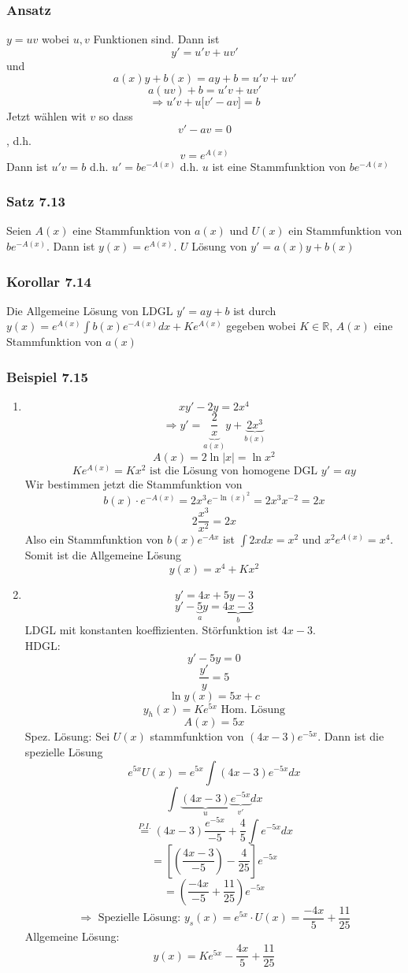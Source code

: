 \subsubsection*{Ansatz}
$y=uv$ wobei $u,v$ Funktionen sind. Dann ist $$y'=u'v+uv'$$ und $$a(x)y+b(x)=ay+b=u'v+uv'$$$$a(uv)+b=u'v+uv'$$$$\Rightarrow u'v+u\lbrack v'-av\rbrack =b$$
Jetzt wählen wit $v$ so dass $$v'-av=0$$, d.h. $$v=e^{A(x)}$$ Dann ist $u'v=b$ d.h. $u'=be^{-A(x)}$ d.h. $u$ ist eine Stammfunktion von $be^{-A(x)}$

\subsubsection*{Satz 7.13}
Seien $A(x)$ eine Stammfunktion von $a(x)$ und $U(x)$ ein Stammfunktion von $be^{-A(x)}$. Dann ist $y(x)=e^{A(x)}$. $U$ Lösung von $y'=a(x)y+b(x)$

\subsubsection*{Korollar 7.14}
Die Allgemeine Lösung von LDGL $y'=ay+b$ ist durch $y(x)=e^{A(x)}\int{b(x)e^{-A(x)} dx}+Ke^{A(x)}$ gegeben wobei $K\in\mathbb{R}$, $A(x)$ eine Stammfunktion von $a(x)$

\subsubsection*{Beispiel 7.15}
\begin{enumerate}
\item $$xy'-2y=2x^4$$
$$\Rightarrow y' = \underbrace {\frac{2}{x}}_{a(x)}y + \underbrace {2{x^3}}_{b(x)}$$
$$A(x)=2\ln\left| x \right|=\ln x^2$$
$$Ke^{A(x)}=Kx^2\text{ ist die Lösung von homogene DGL }y'=ay$$
Wir bestimmen jetzt die Stammfunktion von $$b(x)\cdot e^{-A(x)}=2x^3e^{-\ln (x)^2}=2x^3 x^{-2}=2x$$
$$2\frac{x^3}{x^2}=2x$$
Also ein Stammfunktion von $b(x)e^{-Ax}$ ist  $\int{2xdx=x^2}$ und $x^2e^{A(x)}=x^4$. Somit ist die Allgemeine Lösung $$y(x)=x^4+Kx^2$$
\item $$y'=4x+5y-3$$
\[y' - \underbrace 5_ay = \underbrace {4x - 3}_b\]
LDGL mit konstanten koeffizienten. Störfunktion ist  $4x-3$.\\

\noindent HDGL: $$y'-5y=0$$
$$\frac{y'}{y}=5$$
$$\ln y(x)=5x+c$$
$$y_h(x)=Ke^{5x} \text{ Hom. Lösung}$$
$$A(x)=5x$$
Spez. Lösung: Sei $U(x)$ stammfunktion von $(4x-3)e^{-5x}$. Dann ist die spezielle Lösung $$e^{5x}U(x)=e^{5x}\int{(4x-3)e^{-5x}dx}$$
$$ \int {\underbrace {(4x - 3)}_u\underbrace {{e^{ - 5x}}}_{v'}dx} $$
$$\mathop = \limits^{P.I.} (4x - 3)\frac{{{e^{ - 5x}}}}{{ - 5}} + \frac{4}{5}\int {{e^{ - 5x}}dx}$$
$$ = \left[ {\left( {\frac{{4x - 3}}{{ - 5}}} \right) - \frac{4}{{25}}} \right]{e^{ - 5x}}$$
$$ = \left( {\frac{{ - 4x}}{{ - 5}} + \frac{{11}}{{25}}} \right){e^{ - 5x}}$$
$$\Rightarrow \text{ Spezielle Lösung: }y_s(x)=e^{5x}\cdot U(x)=\frac{-4x}{5}+\frac{11}{25}$$
Allgemeine Lösung: $$y(x)=Ke^{5x}-\frac{4x}{5}+\frac{11}{25}$$
\end{enumerate}

